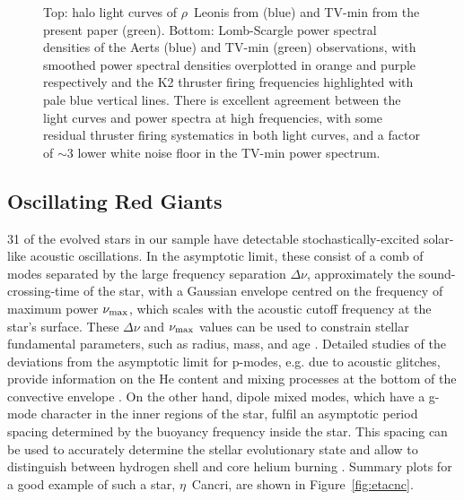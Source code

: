 \documentclass[modern]{aastex62}
\newcommand{\numax}{\mbox{$\nu_{\rm max}$}\xspace}
\newcommand{\Dnu}{\mbox{$\Delta \nu$}\xspace}
\begin{document}
\begin{figure}
\caption{Top: halo light curves of $\rho$~Leonis from \citet{Aerts2018} (blue) and TV-min from the present paper (green). Bottom: Lomb-Scargle power spectral densities of the Aerts (blue) and TV-min (green) observations, with smoothed power spectral densities overplotted in orange and purple respectively and the K2 thruster firing frequencies highlighted with pale blue vertical lines. There is excellent agreement between the light curves and power spectra at high frequencies, with some residual thruster firing systematics in both light curves, and a factor of $\sim 3$ lower white noise floor in the TV-min power spectrum.}
\label{rholeo_comparison}
\end{figure}

\subsection{Oscillating Red Giants}
\label{sec:rgs}
31 of the evolved stars in our sample have detectable stochastically-excited solar-like acoustic oscillations. In the asymptotic limit, these consist of a comb of modes separated by the large frequency separation \Dnu, approximately the sound-crossing-time of the star, with a Gaussian envelope centred on the frequency of maximum power \numax, which scales with the acoustic cutoff frequency at the star's surface. 
These \Dnu and \numax values can be used to constrain stellar fundamental parameters, such as radius, mass, and age \citep[e.g.][, for a recent review]{2017A&ARv..25....1H}. Detailed studies of the deviations from the asymptotic limit for p-modes, e.g. due to acoustic glitches, provide information on the He content and mixing processes at the bottom of the convective envelope \citep[e.g. ][]{Verma2019}. On the other hand, dipole mixed modes, which have a g-mode character in the inner regions of the star, fulfil an asymptotic period spacing determined by the buoyancy frequency inside the star. This spacing can be used to accurately determine the stellar evolutionary state and allow to distinguish between hydrogen shell and core helium burning \citep{bedding2011}. 
Summary plots for a good example of such a star, $\eta$~Cancri, are shown in Figure~\ref{fig:etacnc}.
\end{document}
